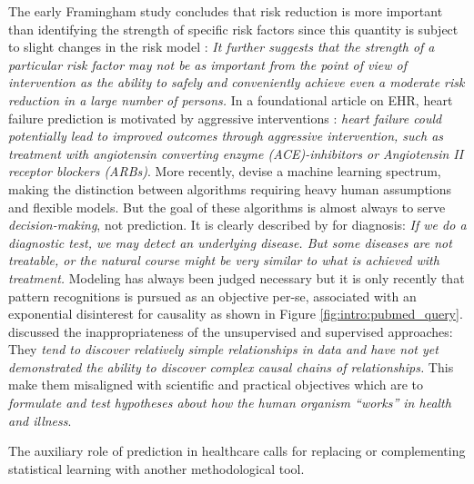 \documentclass[french,12pt,twoside,a4paper]{book}
\begin{document}
\begin{background_box_left}
  The early Framingham study concludes that risk reduction is more important
  than identifying the strength of specific risk factors since this quantity is
  subject to slight changes in the risk model \citep{brand1976multivariate}:
  \textit{It further suggests that the strength of a particular risk factor may
    not be as important from the point of view of intervention as the ability to
    safely and conveniently achieve even a moderate risk reduction in a large
    number of persons.} In a foundational article on EHR, heart failure prediction
  is motivated by aggressive interventions \citep{wu2010prediction}:
  \textit{heart failure could potentially lead to improved outcomes through
    aggressive intervention, such as treatment with angiotensin converting enzyme
    (ACE)-inhibitors or Angiotensin II receptor blockers (ARBs)}. More recently,
  \cite{beam2018big} devise a machine learning spectrum, making the distinction
  between algorithms requiring heavy human assumptions and flexible models. But
  the goal of these algorithms is almost always to serve
  \textit{decision-making}, not prediction. It is clearly described by
  \cite{steyerberg2009applications} for diagnosis: \textit{If we do a diagnostic
    test, we may detect an underlying disease. But some diseases are not
    treatable, or the natural course might be very similar to what is achieved
    with treatment.} Modeling has always been judged necessary but it is only
  recently that pattern recognitions is pursued as an objective per-se,
  associated with an exponential disinterest for causality as shown in Figure
  \ref{fig:intro:pubmed_query}. \cite{patel2009coming} discussed the
  inappropriateness of the unsupervised and supervised approaches: They
  \textit{tend to discover relatively simple relationships in data and have not
    yet demonstrated the ability to discover complex causal chains of
    relationships.} This make them misaligned with scientific and practical
  objectives which are to \textit{formulate and test hypotheses about how the
    human organism “works” in health and illness}.

  The auxiliary role of prediction in healthcare calls for replacing or
  complementing statistical learning with another methodological tool.


\end{background_box_left}
\end{document}
